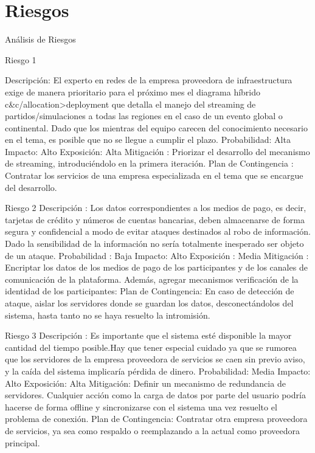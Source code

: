\section{Riesgos}
Análisis de Riesgos

Riesgo 1

Descripción: El experto en redes de la empresa proveedora de infraestructura exige de manera prioritario para el próximo mes el diagrama híbrido  c&c/allocation>deployment
que detalla el manejo del streaming de partidos/simulaciones a todas las regiones en el caso de un evento global o continental. Dado que los mientras del equipo carecen del conocimiento necesario en el tema, es posible que no se llegue a cumplir el plazo.
Probabilidad: Alta
Impacto: Alto
Exposición: Alta
Mitigación : Priorizar el desarrollo del mecanismo de streaming, introduciéndolo en la primera iteración.
Plan de Contingencia : Contratar los servicios de una empresa especializada en el tema
que se encargue del desarrollo.

Riesgo 2
Descripción : Los datos correspondientes a los medios de pago, es decir, tarjetas de crédito
y números de cuentas bancarias, deben almacenarse de forma segura y confidencial  a modo de evitar ataques destinados al robo de información. Dado la sensibilidad de la información no sería totalmente inesperado ser objeto de un ataque.
Probabilidad : Baja
Impacto: Alto
Exposición : Media
Mitigación : Encriptar los datos de los medios de pago de los participantes y de los canales de comunicación de la plataforma. Además, agregar mecanismos verificación de la identidad de los participantes:
Plan de Contingencia: En caso de detección de ataque, aislar los servidores donde se guardan los datos, desconectándolos del sistema, hasta tanto no se haya resuelto la intromisión.


Riesgo 3
Descripción : Es importante que el sistema esté disponible la mayor cantidad del tiempo posible.Hay que tener especial cuidado ya que se rumorea que los servidores de la empresa proveedora de servicios se caen sin previo aviso, y la caída del sistema implicaría
pérdida de dinero.
Probabilidad: Media
Impacto: Alto
Exposición: Alta
Mitigación: Definir un mecanismo de redundancia de servidores. Cualquier acción como la carga de datos por parte del usuario podría hacerse de forma offline y sincronizarse con el sistema una vez resuelto el problema de conexión.
Plan de Contingencia: Contratar otra empresa proveedora de servicios, ya sea como respaldo o reemplazando a la actual como proveedora principal.


